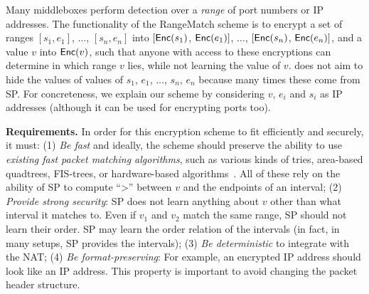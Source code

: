Many middleboxes perform detection over a {\it range} of port numbers or IP addresses. 
%
%
%
The functionality of the RangeMatch scheme is to encrypt a set of ranges $[s_1, e_1]$, $\dots$, $[s_n, e_n]$ into  $[\mathsf{Enc}(s_1)$, $\mathsf{Enc}(e_1)]$, $\dots$, $[\mathsf{Enc}(s_n)$,  $\mathsf{Enc}(e_n)]$, and a value $v$ into $\mathsf{Enc}(v)$, such that anyone with access to these encryptions can determine in which range $v$ lies, while not learning the value of $v$. \sys does not aim to hide the values of values of $s_1$, $e_1$, $\dots$, $s_n$, $e_n$ because many times these come from SP. %
For concreteness, we explain our scheme by considering $v$, $e_i$ and $s_i$ as IP addresses (although it can be used for encrypting ports too).

\noindent\textbf{Requirements.}
%
In order for this encryption scheme to fit \sys efficiently and securely, it must:
(1)   {\em Be fast} %
and ideally, the scheme should preserve the ability to use {\em existing fast packet matching algorithms}, such as  various kinds of tries, area-based quadtrees, FIS-trees, or hardware-based algorithms~\cite{packet_classif}.  All of these rely on the ability of SP  to compute ``>'' between $v$ and the endpoints of an interval;
(2) {\em Provide strong security}: %
 SP does not learn anything about $v$ other than what interval it matches to. %
 Even if $v_1$ and $v_2$ match the same range, SP should not learn their order. SP may learn the order relation of the intervals (in fact, in many setups, SP provides the intervals);\label{req:sec}
(3) {\em Be deterministic} to integrate with the NAT;  \label{req:injective} %
(4) {\em Be format-preserving}: %
For example,  an encrypted IP address should look like an IP address.  This property is important to avoid changing the packet header structure. %

